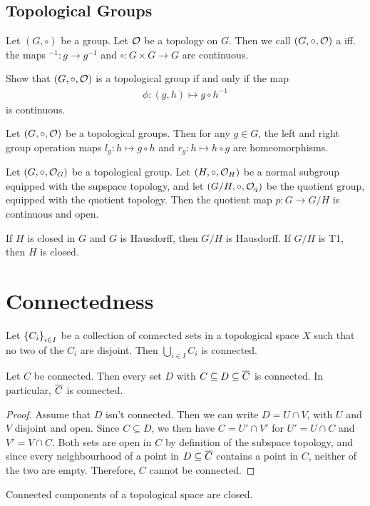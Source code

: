 \section{Topological Groups}
\begin{importantdefinition}{}{}
	Let $(G, \circ)$ be a group. Let $\mathcal{O}$ be a topology on $G$. Then we call $(G, \circ, \mathcal{O})$ a  iff. the maps $^{-1} : g \to g^{-1}$ and $\circ : G \times G \to G$ are continuous.
\end{importantdefinition}
\begin{exercise}
	Show that $(G, \circ, \mathcal{O})$ is a topological group if and only if the map
	\begin{align*}
		\phi : (g,h) \mapsto g \circ h^{-1}
	\end{align*}
	is continuous.
\end{exercise}
\begin{exercise}
	Let $(G, \circ, \mathcal{O})$ be a topological groups. Then for any $g \in G$, the left and right group operation maps $l_g : h \mapsto g \circ h$ and $r_g : h \mapsto h \circ g$ are homeomorphisms.
\end{exercise}
\begin{exercise}
	Let $(G, \circ, \mathcal{O}_G)$ be a topological group. Let $(H, \circ, \mathcal{O}_H)$ be a normal subgroup equipped with the supspace topology, and let $(G/H, \circ, \mathcal{O}_q)$ be the quotient group, equipped with the quotient topology. Then the quotient map $p : G \to G/H$ is continuous and open.
\end{exercise}
\begin{corollary}
	If $H$ is closed in $G$ and $G$ is Hausdorff, then $G/H$ is Hausdorff. If $G/H$ is T1, then $H$ is closed.
\end{corollary}

\chapter{Connectedness}
\begin{theorem}
	Let $\qty{C_i}_{i \in I}$ be a collection of connected sets in a topological space $X$ such that no two of the $C_i$ are disjoint. Then $\bigcup_{i \in I} C_i$ is connected.
\end{theorem}
\begin{theorem}
	Let $C$ be connected. Then every set $D$ with $C \subseteq D \subseteq \overline{{C}}$ is connected. In particular, $\overline{{C}}$ is connected.
\end{theorem}
\begin{proof}
	Assume that $D$ isn't connected. Then we can write $D = U \cap V$, with $U$ and $V$ disjoint and open. Since $C \subseteq D$, we then have $C = U' \cap V'$ for $U' = U \cap C$ and $V' = V \cap C$. Both sets are open in $C$ by definition of the subspace topology, and since every neighbourhood of a point in $D \subseteq \overline{{C}}$ contains a point in $C$, neither of the two are empty. Therefore, $C$ cannot be connected.
\end{proof}
\begin{corollary}
	Connected components of a topological space are closed.
\end{corollary}

